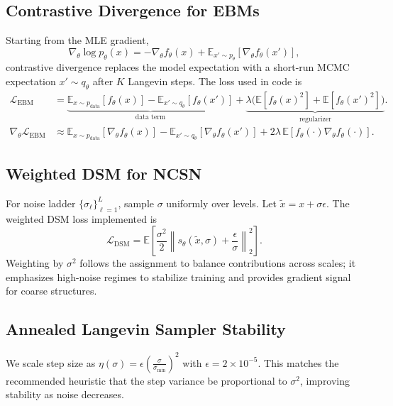 \documentclass[conference]{IEEEtran}
\begin{document}
\subsection{Contrastive Divergence for EBMs}
Starting from the MLE gradient,
\begin{equation}
    \nabla_\theta \log p_\theta(x) = -\nabla_\theta f_\theta(x) + \mathbb{E}_{x' \sim p_\theta}[\nabla_\theta f_\theta(x')],
\end{equation}
contrastive divergence replaces the model expectation with a short-run MCMC expectation $x' \sim q_\theta$ after $K$ Langevin steps. The loss used in code is
\begin{align}
    \mathcal{L}_{\text{EBM}} &= \underbrace{\mathbb{E}_{x \sim p_{\text{data}}}[f_\theta(x)] - \mathbb{E}_{x' \sim q_\theta}[f_\theta(x')]}_{\text{data term}} + \underbrace{\lambda \big( \mathbb{E}[f_\theta(x)^2] + \mathbb{E}[f_\theta(x')^2] \big)}_{\text{regularizer}}. \\
    \nabla_\theta \mathcal{L}_{\text{EBM}} &\approx \mathbb{E}_{x \sim p_{\text{data}}}[\nabla_\theta f_\theta(x)] - \mathbb{E}_{x' \sim q_\theta}[\nabla_\theta f_\theta(x')] + 2\lambda \, \mathbb{E}[f_\theta(\cdot)\nabla_\theta f_\theta(\cdot)].
\end{align}

\subsection{Weighted DSM for NCSN}
For noise ladder $\{\sigma_\ell\}_{\ell=1}^L$, sample $\sigma$ uniformly over levels. Let $\tilde{x} = x + \sigma \epsilon$. The weighted DSM loss implemented is
\begin{equation}
    \mathcal{L}_{\text{DSM}} = \mathbb{E}\left[\frac{\sigma^2}{2} \left\| s_\theta(\tilde{x}, \sigma) + \frac{\epsilon}{\sigma} \right\|_2^2 \right].
\end{equation}
Weighting by $\sigma^2$ follows the assignment to balance contributions across scales; it emphasizes high-noise regimes to stabilize training and provides gradient signal for coarse structures.

\subsection{Annealed Langevin Sampler Stability}
We scale step size as $\eta(\sigma) = \epsilon \left(\frac{\sigma}{\sigma_{\min}}\right)^2$ with $\epsilon = 2\times 10^{-5}$. This matches the recommended heuristic that the step variance be proportional to $\sigma^2$, improving stability as noise decreases.
\end{document}
